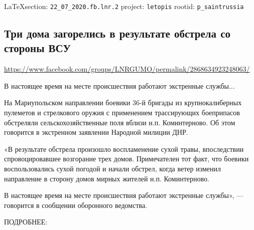  
 
  
\vspace{0.5cm}
{\small\LaTeX section: \verb|22_07_2020.fb.lnr.2| project: \verb|letopis| rootid: \verb|p_saintrussia|}
\vspace{0.5cm}
  
\subsection{Три дома загорелись в результате обстрела со стороны ВСУ}
\label{sec:22_07_2020.fb.lnr.2}
\url{https://www.facebook.com/groups/LNRGUMO/permalink/2868634923248063/}

В настоящее время на месте происшествия работают экстренные службы...

На Мариупольском направлении боевики 36-й бригады из крупнокалиберных пулеметов
и стрелкового оружия с применением трассирующих боеприпасов обстреляли
сельскохозяйственные поля вблизи н.п. Коминтерново. Об этом говорится в
экстренном заявлении Народной милиции ДНР.

«В результате обстрела произошло воспламенение сухой травы, впоследствии
спровоцировавшее возгорание трех домов. Примечателен тот факт, что боевики
воспользовались сухой погодой и начали обстрел, когда ветер изменил направление
в сторону домов мирных жителей н.п. Коминтерново.

В настоящее время на месте происшествия работают экстренные службы», —
говорится в сообщении оборонного ведомства.

ПОДРОБНЕЕ:
